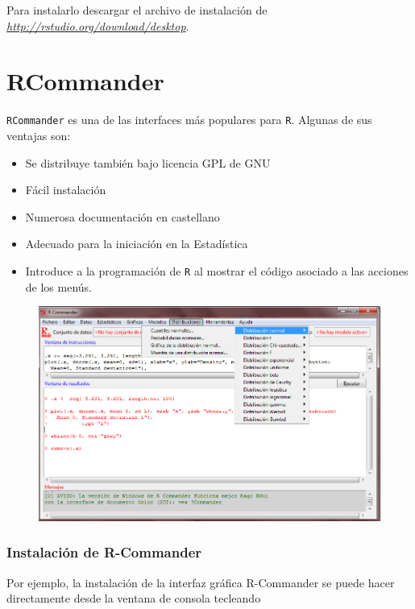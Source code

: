 \documentclass[]{book}
\begin{document}
Para instalarlo descargar el archivo de instalación de
\href{http://rstudio.org/download/desktop}{\emph{http://rstudio.org/download/desktop}}.

\section{RCommander}\label{rcmdr}

\texttt{RCommander} es una de las interfaces más populares para
\texttt{R}. Algunas de sus ventajas son:

\begin{itemize}
\item
  Se distribuye también bajo licencia GPL de GNU
\item
  Fácil instalación
\item
  Numerosa documentación en castellano
\item
  Adecuado para la iniciación en la Estadística
\item
  Introduce a la programación de \texttt{R} al mostrar el código
  asociado a las acciones de los menús.
\end{itemize}

\begin{figure}
\centering
\includegraphics{figuras/Rcommander.png}
\caption{}
\end{figure}

\subsubsection{Instalación de
R-Commander}\label{instalacion-de-r-commander}

Por ejemplo, la instalación de la interfaz gráfica R-Commander se puede
hacer directamente desde la ventana de consola tecleando
\end{document}
